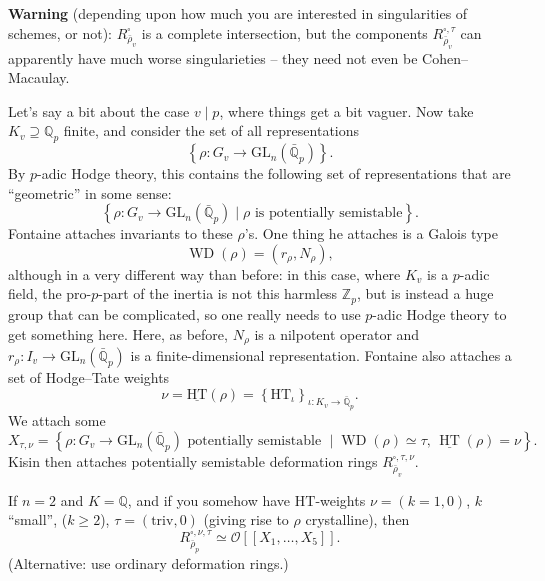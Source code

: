 \documentclass[reqno]{amsart} 
\begin{document}
\textbf{Warning} (depending upon how much you are interested in singularities of schemes, or not): $R_{\bar{\rho}_v}^{\square}$ is a complete intersection, but the components $R_{\bar{\rho}_v}^{\square, \tau}$ can apparently have much worse singularieties -- they need not even be Cohen--Macaulay.

Let's say a bit about the case $v \mid p$, where things get a bit vaguer.  Now take $K_v \supseteq \mathbb{Q}_p$ finite, and consider the set of all representations
\begin{equation}\label{eq:cq6s0s7n4f}
  \left\{ \rho : G_v \rightarrow \mathrm{GL}_n(\bar{\mathbb{Q}}_p) \right\}.
\end{equation}
By $p$-adic Hodge theory, this contains the following set of representations that are ``geometric'' in some sense:
\begin{equation}\label{eq:cq6s0s8j3o}
  \left\{ \rho : G_v \rightarrow \mathrm{GL}_n(\bar{\mathbb{Q}}_p) \mid \rho \text{ is potentially semistable}\right\}.
\end{equation}
Fontaine attaches invariants to these $\rho$'s.  One thing he attaches is a Galois type
\begin{equation*}
  \operatorname{WD}(\rho) =(r_\rho, N_\rho),
\end{equation*}
although in a very different way than before: in this case, where $K_v$ is a $p$-adic field, the pro-$p$-part of the inertia is not this harmless $\mathbb{Z}_p$, but is instead a huge group that can be complicated, so one really needs to use $p$-adic Hodge theory to get something here.  Here, as before, $N_\rho$ is a nilpotent operator and $r_\rho : I_v \rightarrow \mathrm{GL}_n(\bar{\mathbb{Q}}_p)$ is a finite-dimensional representation.  Fontaine also attaches a set of Hodge--Tate weights
\begin{equation*}
  \nu = \underline{\mathrm{H T}}(\rho) = \left\{ \mathrm{H T}_{\iota} \right\}_{\iota : K_v \rightarrow \bar{\mathbb{Q}}_p}.
\end{equation*}
We attach some
\begin{equation*}
  X_{\tau, \nu} = \left\{ \rho : G_v \rightarrow \mathrm{GL}_n(\bar{\mathbb{Q}}_p) \text{ potentially semistable } \mid
    \operatorname{W D}(\rho) \simeq \tau,
    \,
    \underline{\operatorname{H T}}(\rho) = \nu
  \right\}.
\end{equation*}
Kisin then attaches potentially semistable deformation rings $R_{\bar{\rho}_v}^{\square, \tau, \nu}$.
\begin{remark}\label{remark:cq6thpcqah}
  If $n = 2$ and $K = \mathbb{Q}$, and if you somehow have $\mathrm{H T}$-weights $\nu =(k = 1, 0)$, $k$ ``small'', ($k \geq 2$),
  $\tau = (\mathrm{triv}, 0)$ (giving rise to $\rho$ crystalline), then
  \begin{equation*}
    R_{\bar{\rho}_p}^{\square, \nu, \tau} \simeq \mathcal{O} [[ X_1, \dotsc, X_5]].
  \end{equation*}
  (Alternative: use ordinary deformation rings.)
\end{remark}
\end{document}
